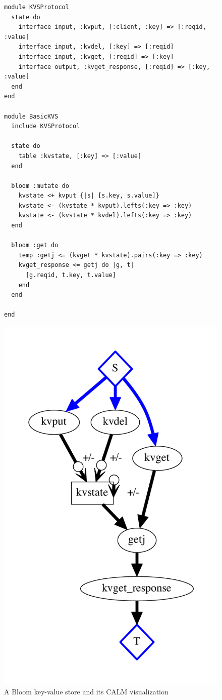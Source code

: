 \begin{figure}[t]
\begin{minipage}{.48\textwidth}

\begin{scriptsize}
\begin{lstlisting}
module KVSProtocol
  state do
    interface input, :kvput, [:client, :key] => [:reqid, :value]
    interface input, :kvdel, [:key] => [:reqid]
    interface input, :kvget, [:reqid] => [:key]
    interface output, :kvget_response, [:reqid] => [:key, :value]
  end
end

module BasicKVS
  include KVSProtocol

  state do
    table :kvstate, [:key] => [:value]
  end

  bloom :mutate do
    kvstate <+ kvput {|s| [s.key, s.value]}
    kvstate <- (kvstate * kvput).lefts(:key => :key)
    kvstate <- (kvstate * kvdel).lefts(:key => :key)
  end

  bloom :get do
    temp :getj <= (kvget * kvstate).pairs(:key => :key)
    kvget_response <= getj do |g, t|
      [g.reqid, t.key, t.value]
    end
  end

end

\end{lstlisting}
\end{scriptsize}
\end{minipage}
\begin{minipage}{.48\textwidth}
\raggedleft
\includegraphics[width=0.7\linewidth]{kvs.pdf}
\end{minipage}

\vspace{-10pt}
\caption{A Bloom key-value store and its CALM visualization}
\label{fig:kvs}
\vspace{-2pt}

\end{figure}



